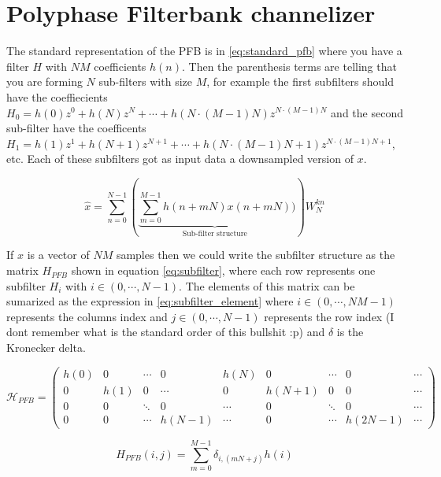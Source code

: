 \section{Polyphase Filterbank channelizer}

The standard representation of the PFB is in \ref{eq:standard_pfb} where you have a filter $H$ with $NM$ coefficients $h(n)$. Then the parenthesis terms are telling that you are forming $N$ sub-filters with size $M$, for example the first subfilters should have the coeffiecients $H_{0} = h(0)z^0+h(N)z^{N}+\cdots + h(N\cdot(M-1)N)z^{N\cdot(M-1)N}$ and the second sub-filter have the coefficents $H_{1} = h(1)z^1+h(N+1)z^{N+1}+\cdots + h(N\cdot(M-1)N+1)z^{N\cdot(M-1)N+1}$, etc.
Each of these subfilters got as input data a downsampled version of $x$. 

\begin{equation}
    \hat{x} = \sum_{n=0}^{N-1} \left( \underbrace{\sum_{m=0}^{M-1} h(n+mN)x(n+mN)}_{\text{Sub-filter structure}} )\right)W_{N}^{kn}
    \label{eq:standard_pfb}
\end{equation}


If $x$ is a vector of $NM$ samples then we could write the subfilter structure as the matrix $H_{PFB}$ shown in equation \ref{eq:subfilter}, where each row represents one subfilter $H_{i}$ with $i \in (0,\cdots, N-1)$. The elements of this matrix can be sumarized as the expression in \ref{eq:subfilter_element} where $i \in (0,\cdots, NM-1)$ represents the columns index and $j \in (0,\cdots, N-1)$ represents the row index (I dont remember what is the standard order of this bullshit :p) and $\delta$ is the Kronecker delta.

\begin{equation}
    \label{eq:subfilter}
    \mathcal{H}_{PFB} = 
    \begin{pmatrix}
        h(0) & 0    &\cdots &0       &h(N)    & 0     & \cdots &  0     & \cdots \\
        0    & h(1) &0      &\cdots  &0       & h(N+1)& 0      &  0     & \cdots \\
        0    & 0    &\ddots &0       & \cdots & 0     & \ddots &  0     & \cdots \\
        0    & 0    &\cdots & h(N-1) &\cdots  & 0     & \cdots &h(2N-1) & \cdots 
    \end{pmatrix}
\end{equation}

\begin{equation}
    \label{eq:subfilter_element}
    H_{PFB}(i,j)= \sum_{m=0}^{M-1} \delta_{i,(mN+j)}h(i)
\end{equation}

